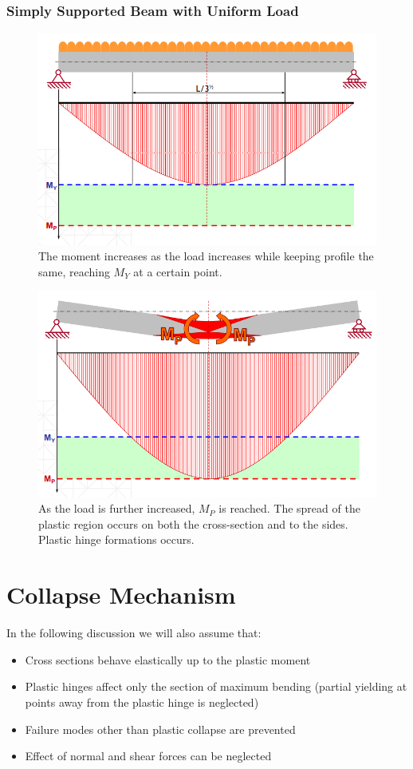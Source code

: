 \documentclass[class=report, crop=false, 12pt,a4paper]{standalone}
\begin{document}
\subsubsection{\large Simply Supported Beam with Uniform Load}
\begin{figure}[H]
  \centering
  \includegraphics[width = 0.9 \textwidth]{../img/beam24.PNG}
  \caption{The moment increases as the load increases while keeping profile the same, reaching $M_Y$ at a certain point.}
\end{figure}
\begin{figure}[H]
  \centering
  \includegraphics[width = 0.9 \textwidth]{../img/beam25.PNG}
  \caption{As the load is further increased, $M_P$ is reached. The spread of the plastic region occurs on both the cross-section and to the sides. Plastic hinge formations occurs.}
\end{figure}
\section{Collapse Mechanism}
In the following discussion we will also assume that: 
\begin{itemize}
  \item Cross sections behave elastically up to the plastic moment
  \item Plastic hinges affect only the section of maximum bending (partial yielding at points away from the plastic hinge is neglected)
  \item Failure modes other than plastic collapse are prevented
  \item Effect of normal and shear forces can be neglected
\end{itemize}
\end{document}
